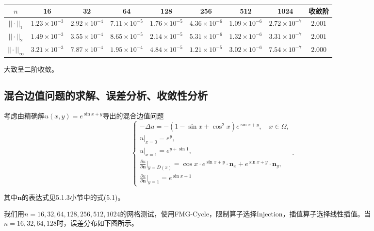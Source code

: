 \documentclass[lang=cn,10pt]{elegantbook}
\begin{document}
\begin{table}[H]
  \centering
  \small
  \begin{tabular}{c|ccccccc|c}
  \textbf{$n$}        & 16                   & 32                   & 64                   & 128                  & 256                  & 512                  & 1024                  & 收敛阶 \\ \hline
  $||\cdot||_1$      & $1.23\times 10^{-3}$ & $2.92\times 10^{-4}$ & $7.11\times 10^{-5}$ & $1.76\times 10^{-5}$ & $4.36\times 10^{-6}$ & $1.09\times 10^{-6}$ & $2.72\times 10^{-7}$ & $2.001$\\
  $||\cdot||_2$      & $1.49\times 10^{-3}$ & $3.55\times 10^{-4}$ & $8.65\times 10^{-5}$ & $2.14\times 10^{-5}$ & $5.31\times 10^{-6}$ & $1.32\times 10^{-6}$ & $3.31\times 10^{-7}$ & $2.001$\\
  $||\cdot||_\infty$ & $3.21\times 10^{-3}$ & $7.87\times 10^{-4}$ & $1.95\times 10^{-4}$ & $4.84\times 10^{-5}$ & $1.21\times 10^{-5}$ & $3.02\times 10^{-6}$ & $7.54\times 10^{-7}$ & $2.000$
  \end{tabular}
\end{table}

大致呈二阶收敛。

\subsection{混合边值问题的求解、误差分析、收敛性分析}

考虑由精确解$u(x,y)=e^{\sin x+y}$导出的混合边值问题
\begin{equation}
  \left\{
    \begin{array}{l}
      -\Delta u = -(1-\sin x+\cos^2 x)e^{\sin x + y},\quad x\in\Omega, \\
      u|_{x=0}=e^{y},\\
      u|_{x=1}=e^{y+\sin 1},\\
      \frac{\partial u}{\partial \mathbf{n}}|_{y=D(x)}=\cos x\cdot e^{\sin x + y} \cdot \mathbf{n}_x + e^{\sin x + y} \cdot \mathbf{n}_y,\\
      \frac{\partial u}{\partial \mathbf{n}}|_{y=1}=e^{\sin x+1}
    \end{array}
  \right. .
\end{equation}

其中$\mathbf{n}$的表达式见5.1.3小节中的式(5.1)。

我们用$n=16,32,64,128,256,512,1024$的网格测试，使用FMG-Cycle，限制算子选择Injection，插值算子选择线性插值。当$n=16,32,64,128$时，误差分布如下图所示。
\end{document}
